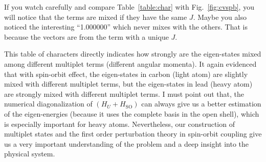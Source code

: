 If you watch carefully and compare Table~\ref{table:char}
with Fig.~\ref{fig:cvspb}, you will notice that the terms are
mixed if they have the same $J$. Maybe you also noticed the interesting ``1.000000''
which never mixes with the others. That is because the vectors are from the
term with a unique $J$.

This table of characters directly indicates how strongly
are the eigen-states mixed among different multiplet terms (different
angular momenta). It again evidenced that with spin-orbit effect,
the eigen-states in carbon (light atom) are slightly mixed with different multiplet terms,
but the eigen-states in lead (heavy atom) are strongly mixed with different multiplet terms.
I must point out that, the numerical diagonalization of $(H_U+H_\text{SO})$
can always give us a better estimation of the eigen-energies (because it uses
the complete basis in the open shell), which is especially important for heavy atoms.
Nevertheless, our construction of multiplet states and
the first order perturbation theory in spin-orbit coupling give us a very
important understanding of the problem and a deep insight into the physical system.

